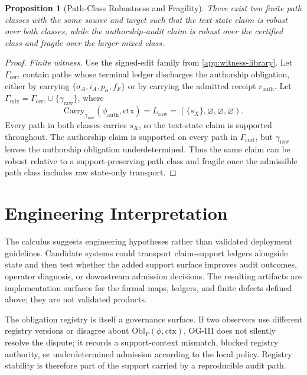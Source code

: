 \documentclass[11pt,twoside]{article}
\newtheorem{proposition}[theorem]{Proposition}
\theoremstyle{definition}
\newcommand{\Obl}{\mathrm{Obl}}
\newcommand{\Carry}{\mathrm{Carry}}
\newcommand{\ctx}{\mathrm{ctx}}
\begin{document}
\begin{proposition}[Path-Class Robustness and Fragility]
\label{prop:path-class-robustness}
There exist two finite path classes with the same source and target such that
the text-state claim is robust over both classes, while the authorship-audit
claim is robust over the certified class and fragile over the larger mixed
class.
\end{proposition}

\begin{proof}
\textit{Finite witness.}
Use the signed-edit family from \cref{app:witness-library}. Let
$\Gamma_{\mathrm{cert}}$ contain paths whose terminal ledger discharges the
authorship obligation, either by carrying
$\{\sigma_A,i_A,p_\alpha,f_F\}$ or by carrying the admitted receipt
$r_{\mathrm{auth}}$. Let
$\Gamma_{\mathrm{mix}}=\Gamma_{\mathrm{cert}}\cup\{\gamma_{\mathrm{raw}}\}$,
where
\[
  \Carry_{\gamma_{\mathrm{raw}}}(\phi_{\mathrm{auth}},\ctx)
  =
  L_{\mathrm{raw}}=(\{s_X\},\varnothing,\varnothing,\varnothing).
\]
Every path in both classes carries $s_X$, so the text-state claim is supported
throughout. The authorship claim is supported on every path in
$\Gamma_{\mathrm{cert}}$, but $\gamma_{\mathrm{raw}}$ leaves the authorship
obligation underdetermined. Thus the same claim can be robust relative to a
support-preserving path class and fragile once the admissible path class
includes raw state-only transport.
\end{proof}

\section{Engineering Interpretation}
\label{sec:engineering}

The calculus suggests engineering hypotheses rather than validated deployment
guidelines. Candidate systems could transport claim-support ledgers alongside
state and then test whether the added support surface improves audit outcomes,
operator diagnosis, or downstream admission decisions. The resulting artifacts
are implementation surfaces for the formal maps, ledgers, and finite defects
defined above; they are not validated products.

The obligation registry is itself a governance surface. If two observers use
different registry versions or disagree about
$\Obl_P(\phi,\ctx)$, OG-III does not silently resolve the dispute; it records a
support-context mismatch, blocked registry authority, or underdetermined
admission according to the local policy. Registry stability is therefore part
of the support carried by a reproducible audit path.
\end{document}
